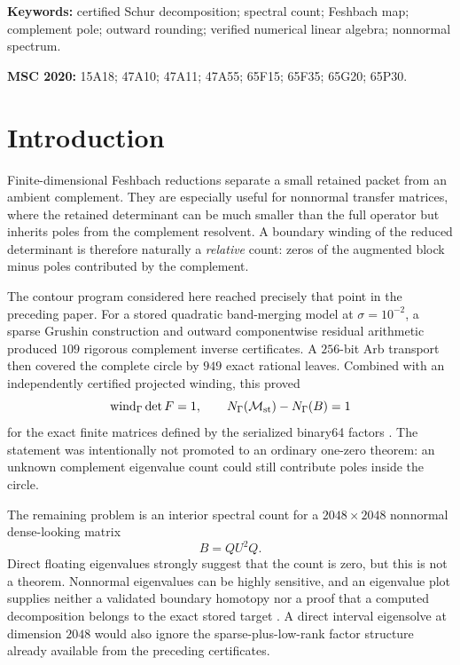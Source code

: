 \documentclass[11pt]{article}
\theoremstyle{definition}
\theoremstyle{remark}
\newcommand{\wind}{\operatorname{wind}}
\newcommand{\Maug}{\mathcal M_{\rm st}}
\begin{document}
\noindent\textbf{Keywords:} certified Schur decomposition; spectral count;
Feshbach map; complement pole; outward rounding; verified numerical linear
algebra; nonnormal spectrum.

\medskip
\noindent\textbf{MSC 2020:} 15A18; 47A10; 47A11; 47A55; 65F15; 65F35;
65G20; 65P30.

\section{Introduction}
\label{sec:introduction}

Finite-dimensional Feshbach reductions separate a small retained packet
from an ambient complement.  They are especially useful for nonnormal
transfer matrices, where the retained determinant can be much smaller than
the full operator but inherits poles from the complement resolvent.  A
boundary winding of the reduced determinant is therefore naturally a
\emph{relative} count: zeros of the augmented block minus poles contributed
by the complement.

The contour program considered here reached precisely that point in the
preceding paper.  For a stored quadratic band-merging model at
\(\sigma=10^{-2}\), a sparse Grushin construction and outward componentwise
residual arithmetic produced \(109\) rigorous complement inverse
certificates.  A \(256\)-bit Arb transport then covered the complete circle
by \(949\) exact rational leaves.  Combined with an independently certified
projected winding, this proved
\[
 \wind_\Gamma\det F=1,\qquad
 N_\Gamma(\Maug)-N_\Gamma(B)=1
\]
for the exact finite matrices defined by the serialized binary64 factors
\citep{WangLedger2026,WangAtlas2026}.  The statement was intentionally not
promoted to an ordinary one-zero theorem: an unknown complement eigenvalue
count could still contribute poles inside the circle.

The remaining problem is an interior spectral count for a
\(2048\times2048\) nonnormal dense-looking matrix
\[
 B=QU^2Q.
\]
Direct floating eigenvalues strongly suggest that the count is zero, but
this is not a theorem.  Nonnormal eigenvalues can be highly sensitive, and
an eigenvalue plot supplies neither a validated boundary homotopy nor a
proof that a computed decomposition belongs to the exact stored target
\citep{TrefethenEmbree2005}.  A direct interval eigensolve at dimension
\(2048\) would also ignore the sparse-plus-low-rank factor structure already
available from the preceding certificates.
\end{document}
